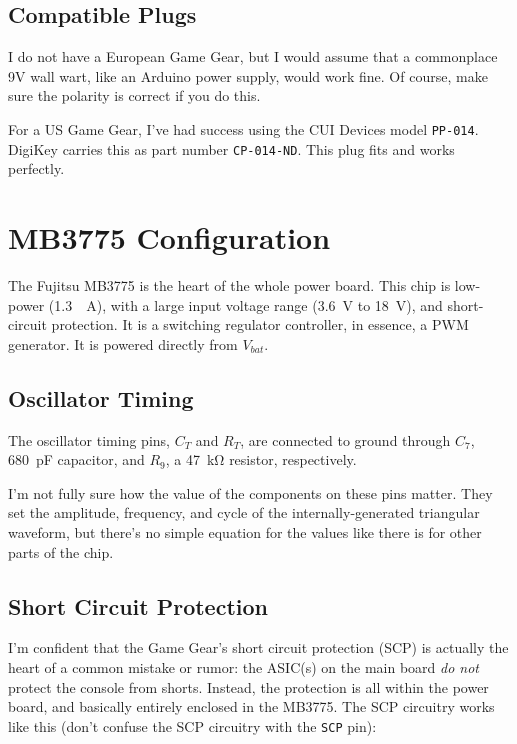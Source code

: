 \documentclass{article}
\newcommand{\Vbat}{$V_{bat}$}
\newcommand{\chippin}{\texttt}
\begin{document}
\subsection{Compatible Plugs}
I do not have a European Game Gear, but I would assume that a
commonplace 9V wall wart, like an Arduino power supply, would work
fine. Of course, make sure the polarity is correct if you do this.

For a US Game Gear, I've had success using the CUI Devices model
\texttt{PP-014}. DigiKey carries this as part number
\texttt{CP-014-ND}. This plug fits and works perfectly.

\section{MB3775 Configuration}
The Fujitsu MB3775 is the heart of the whole power board. This chip is
low-power (\qty{1.3}{\milli{}A}), with a large input voltage range
(\qty{3.6}{\volt} to \qty{18}{\volt}), and short-circuit
protection. It is a switching regulator controller, in essence, a PWM
generator. It is powered directly from \Vbat{}.

\subsection{Oscillator Timing}
The oscillator timing pins, $C_T$ and $R_T$, are connected to ground
through $C_7$, \qty{680}{\pico\farad} capacitor, and $R_9$, a
\qty{47}{\kilo\ohm} resistor, respectively.

I'm not fully sure how the value of the components on these pins
matter. They set the amplitude, frequency, and cycle of the
internally-generated triangular waveform, but there's no simple
equation for the values like there is for other parts of the chip.

\subsection{Short Circuit Protection}
I'm confident that the Game Gear's short circuit protection (SCP) is
actually the heart of a common mistake or rumor: the ASIC(s) on the
main board \emph{do not} protect the console from shorts. Instead, the
protection is all within the power board, and basically entirely
enclosed in the MB3775. The SCP circuitry works like this (don't
confuse the SCP circuitry with the \chippin{SCP} pin):
\end{document}
